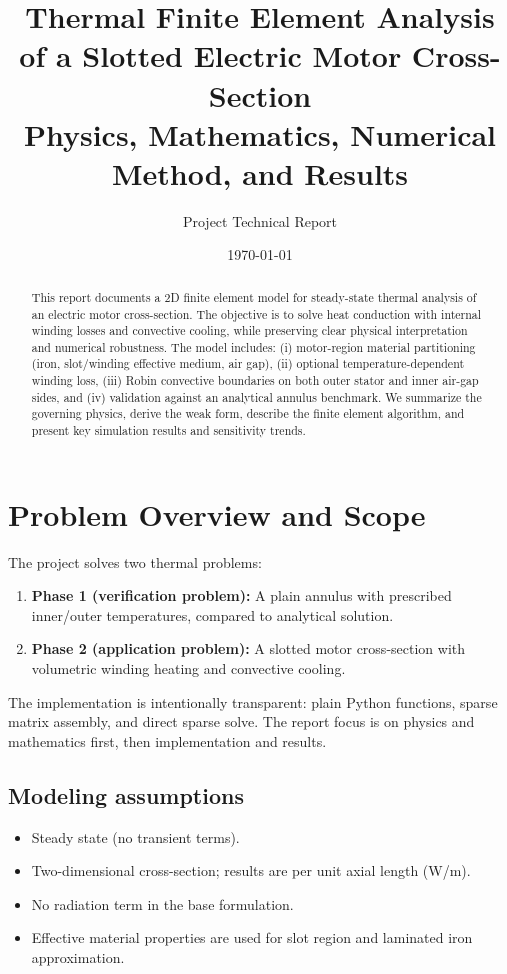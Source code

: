 \documentclass[11pt,a4paper]{article}
\title{Thermal Finite Element Analysis of a Slotted Electric Motor Cross-Section\\
\large Physics, Mathematics, Numerical Method, and Results}
\author{Project Technical Report}
\date{\today}
\begin{document}
\maketitle

\begin{abstract}
This report documents a 2D finite element model for steady-state thermal analysis of an electric motor cross-section. The objective is to solve heat conduction with internal winding losses and convective cooling, while preserving clear physical interpretation and numerical robustness. The model includes: (i) motor-region material partitioning (iron, slot/winding effective medium, air gap), (ii) optional temperature-dependent winding loss, (iii) Robin convective boundaries on both outer stator and inner air-gap sides, and (iv) validation against an analytical annulus benchmark. We summarize the governing physics, derive the weak form, describe the finite element algorithm, and present key simulation results and sensitivity trends.
\end{abstract}

\tableofcontents
\newpage

\section{Problem Overview and Scope}
The project solves two thermal problems:
\begin{enumerate}
    \item \textbf{Phase 1 (verification problem):} A plain annulus with prescribed inner/outer temperatures, compared to analytical solution.
    \item \textbf{Phase 2 (application problem):} A slotted motor cross-section with volumetric winding heating and convective cooling.
\end{enumerate}

The implementation is intentionally transparent: plain Python functions, sparse matrix assembly, and direct sparse solve. The report focus is on physics and mathematics first, then implementation and results.

\subsection*{Modeling assumptions}
\begin{itemize}
    \item Steady state (no transient terms).
    \item Two-dimensional cross-section; results are per unit axial length (W/m).
    \item No radiation term in the base formulation.
    \item Effective material properties are used for slot region and laminated iron approximation.
\end{itemize}
\end{document}

